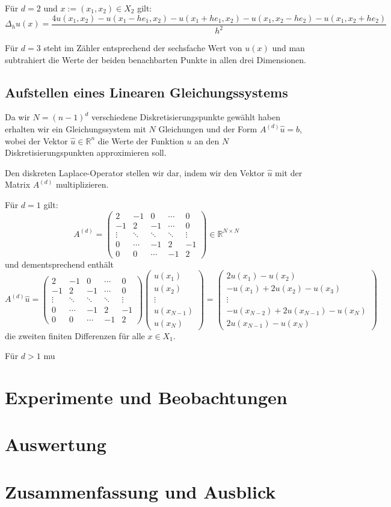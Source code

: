 \documentclass{scrartcl}
\newcommand{\R}{\mathbb{R}}
\begin{document}
Für $d=2$ und $x:=(x_1,x_2)\in X_2$ gilt:
\[\Delta_h u(x) = \frac{4u(x_1,x_2)-u(x_1-he_1,x_2)-u(x_1+he_1,x_2)-u(x_1,x_2-he_2)-u(x_1,x_2+he_2)}{h^2}\]

Für $d=3$ steht im Zähler entsprechend der sechsfache Wert von $u(x)$ und man subtrahiert die Werte der beiden benachbarten Punkte in allen drei Dimensionen.

\subsection{Aufstellen eines Linearen Gleichungssystems}
Da wir $N=(n-1)^d$ verschiedene Diskretisierungspunkte gewählt haben erhalten wir ein Gleichungssystem mit $N$ Gleichungen und der Form $A^{(d)}\hat{u}=b$, wobei der Vektor $\hat{u}\in\R^n$ die Werte der Funktion $u$ an den $N$ Diskretisierungspunkten approximieren soll.

Den diskreten Laplace-Operator stellen wir dar, indem wir den Vektor $\hat{u}$ mit der Matrix $A^{(d)}$ multiplizieren.

Für $d=1$ gilt:
\[A^{(d)}=
\begin{pmatrix}
   2 & -1 &  0 & \cdots & 0 \\
  -1 &  2 & -1 & \cdots & 0 \\
   \vdots & \ddots & \ddots & \ddots & \vdots \\
   0 & \cdots & -1 &  2 & -1 \\
   0 & 0 & \cdots & -1 &  2
\end{pmatrix}
\in\R^{N\times N}
\]
und dementsprechend enthält
\[A^{(d)}\hat{u}=
\begin{pmatrix}
   2 & -1 &  0 & \cdots & 0 \\
  -1 &  2 & -1 & \cdots & 0 \\
   \vdots & \ddots & \ddots & \ddots & \vdots \\
   0 & \cdots & -1 &  2 & -1 \\
   0 & 0 & \cdots & -1 &  2
\end{pmatrix}
\begin{pmatrix}
  u(x_1)\\
  u(x_2)\\
  \vdots\\
  u(x_{N-1})\\
  u(x_N)
\end{pmatrix}
=
\begin{pmatrix}
  2u(x_1)-u(x_2)\\
  -u(x_1)+2u(x_2)-u(x_3)\\
  \vdots\\
  -u(x_{N-2})+2u(x_{N-1})-u(x_N)\\
  2u(x_{N-1})-u(x_N)
\end{pmatrix}
\]
die zweiten finiten Differenzen für alle $x\in X_1$.

Für $d > 1$ mu
\pagebreak
\section{Experimente und Beobachtungen}


\pagebreak
\section{Auswertung}

\pagebreak
\section{Zusammenfassung und Ausblick}

\pagebreak


\end{document}
